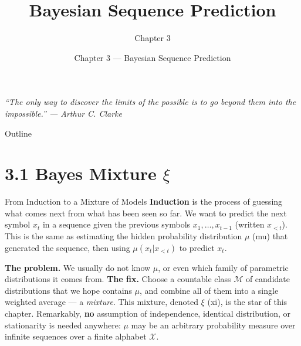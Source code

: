 \documentclass[aspectratio=169,10pt]{beamer}
\title{Bayesian Sequence Prediction}
\subtitle{Chapter 3}
\author{Chapter 3 --- Bayesian Sequence Prediction}
\institute{An Introduction to Universal Artificial Intelligence \\ \small Hutter, Quarel, Catt (2024)}
\date{}
\newcommand{\X}{\mathcal{X}}
\newcommand{\Mcal}{\mathcal{M}}
\begin{document}
\begin{frame}
  \titlepage
  \vspace{-4mm}
  \begin{center}
  \small\itshape ``The only way to discover the limits of the possible is to go beyond them into the impossible.'' --- Arthur C. Clarke
  \end{center}
\end{frame}

\begin{frame}{Outline}
  \tableofcontents
\end{frame}

\section{3.1 Bayes Mixture $\xi$}

\begin{frame}{From Induction to a Mixture of Models}
  \textbf{Induction} is the process of guessing what comes next from what has
  been seen so far. We want to predict the next symbol $x_t$ in a sequence
  given the previous symbols $x_1,\dots,x_{t-1}$ (written $x_{<t}$). This is
  the same as estimating the hidden probability distribution $\mu$ (mu) that
  generated the sequence, then using $\mu(x_t|x_{<t})$ to predict $x_t$.

  \vspace{2mm}
  \textbf{The problem.} We usually do not know $\mu$, or even which family of
  parametric distributions it comes from. \textbf{The fix.} Choose a countable
  class $\Mcal$ of candidate distributions that we hope contains $\mu$, and
  combine all of them into a single weighted average --- a \emph{mixture}.
  This mixture, denoted $\xi$ (xi), is the star of this chapter. Remarkably,
  \textbf{no} assumption of independence, identical distribution, or
  stationarity is needed anywhere: $\mu$ may be an arbitrary probability
  measure over infinite sequences over a finite alphabet $\X$.
\end{frame}
\end{document}
